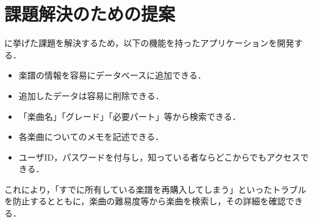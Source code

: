 \chapter{課題解決のための提案}
に挙げた課題を解決するため，以下の機能を持ったアプリケーションを開発する．
\begin{itemize}
    \item 楽譜の情報を容易にデータベースに追加できる．
    \item 追加したデータは容易に削除できる．
    \item 「楽曲名」「グレード」「必要パート」等から検索できる．
    \item 各楽曲についてのメモを記述できる．
    \item ユーザID，パスワードを付与し，知っている者ならどこからでもアクセスできる．
\end{itemize}
これにより，「すでに所有している楽譜を再購入してしまう」といったトラブルを防止するとともに，楽曲の難易度等から楽曲を検索し，その詳細を確認できる．